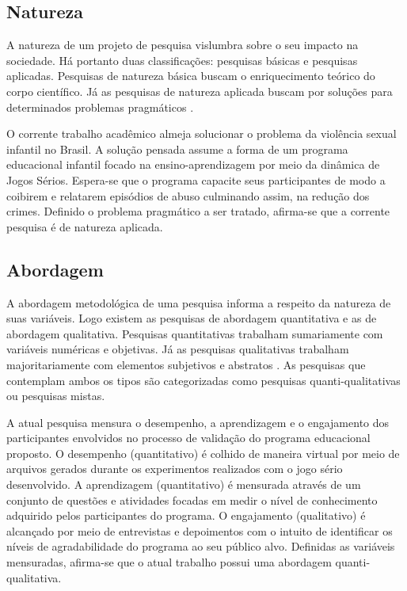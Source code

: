 

\subsection{Natureza}\label{sub:natureza}

A natureza de um projeto de pesquisa vislumbra sobre o seu impacto na sociedade. Há portanto duas classificações: pesquisas básicas e pesquisas aplicadas. Pesquisas de natureza básica buscam o enriquecimento teórico do corpo científico. Já as pesquisas de natureza aplicada buscam por soluções para determinados problemas pragmáticos \cite{zanella2006metodologia}.

O corrente trabalho acadêmico almeja solucionar o problema da violência sexual infantil no Brasil. A solução pensada assume a forma de um programa educacional infantil focado na ensino-aprendizagem por meio da dinâmica de Jogos Sérios. Espera-se que o programa capacite seus participantes de modo a coibirem e relatarem episódios de abuso culminando assim, na redução dos crimes. Definido o problema pragmático a ser tratado, afirma-se que a corrente pesquisa é de natureza aplicada.



\subsection{Abordagem}\label{sub:abordagem}

A abordagem metodológica de uma pesquisa informa a respeito da natureza de suas variáveis. Logo existem as pesquisas de abordagem quantitativa e as de abordagem qualitativa. Pesquisas quantitativas trabalham sumariamente com variáveis numéricas e objetivas. Já as pesquisas qualitativas trabalham majoritariamente com elementos subjetivos e abstratos \cite{carlos2002elaborar}. As pesquisas que contemplam ambos os tipos são categorizadas como pesquisas quanti-qualitativas ou pesquisas mistas. 

A atual pesquisa mensura o desempenho, a aprendizagem e o engajamento dos participantes envolvidos no processo de validação do programa educacional proposto. O desempenho (quantitativo) é colhido de maneira virtual por meio de arquivos gerados durante os experimentos realizados com o jogo sério desenvolvido. A aprendizagem (quantitativo) é mensurada através de um conjunto de questões e atividades focadas em medir o nível de conhecimento adquirido pelos participantes do programa. O engajamento (qualitativo) é alcançado por meio de entrevistas e depoimentos com o intuito de identificar os níveis de agradabilidade do programa ao seu público alvo. Definidas as variáveis mensuradas, afirma-se que o atual trabalho possui uma abordagem quanti-qualitativa.

